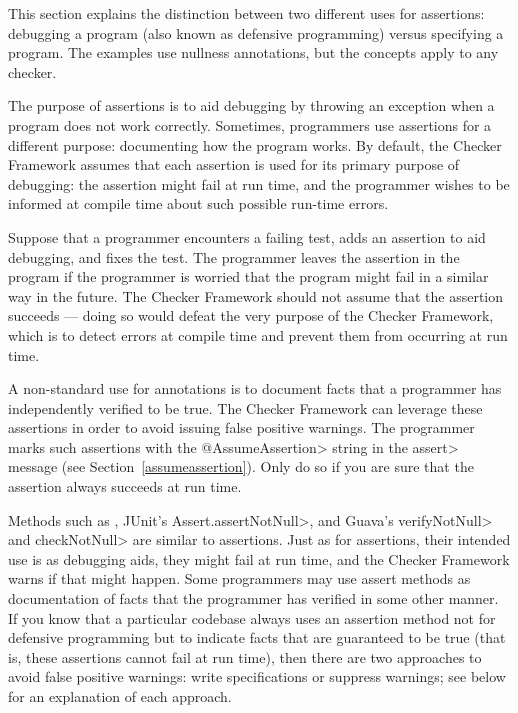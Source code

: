 


This section explains the distinction between two different uses for
assertions:  debugging a program (also known as defensive programming)
versus specifying a program.  The examples use nullness annotations, but
the concepts apply to any checker.

The purpose of assertions is to aid debugging by throwing an exception
when a program does not work correctly.  Sometimes, programmers use assertions for a
different  purpose:  documenting how
the program works.  By default, the Checker Framework assumes that each assertion
is used for its primary purpose of debugging:  the assertion might fail at run time, and the programmer
wishes to be informed at compile time about such possible run-time errors.

Suppose that a
programmer encounters a failing test, adds an assertion to aid debugging, and fixes the
test.  The programmer leaves the assertion in the program if the programmer
is worried that the program might fail in a similar way in the future.
The Checker Framework should not assume that the assertion succeeds ---
doing so would defeat the very purpose of the Checker Framework, which is
to detect errors at compile time and prevent them from occurring at run
time.

A non-standard use for annotations is to document facts that a programmer
has independently verified to be true.  The Checker Framework can
leverage these assertions in order to avoid issuing false positive
warnings.  The programmer marks such assertions with the \<@AssumeAssertion>
string in the \<assert> message (see Section~\ref{assumeassertion}).  Only
do so if you are sure that the assertion always succeeds at run time.

\label{assertion-methods}
Methods such as
,
JUnit's \<Assert.assertNotNull>, and
Guava's \<verifyNotNull> and \<checkNotNull> are
similar to assertions.  Just as for assertions, their intended use is as
debugging aids, they might fail at run time, and the Checker Framework
warns if that might happen.
Some programmers may use assert methods as documentation of facts
that the programmer has verified in some other manner.
If you know that a particular codebase always uses
an assertion method not for defensive programming but to indicate
facts that are guaranteed to be true (that is, these assertions cannot
fail at run time), then there are two approaches to avoid false positive
warnings:  write specifications or suppress
warnings; see below for an explanation of each approach.

